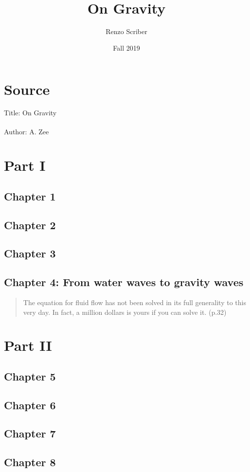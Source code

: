 \documentclass[a4paper]{article}
\title{On Gravity}
\author{Renzo Scriber}
\date{Fall 2019}
\begin{document}
\maketitle

\section*{Source}
Title: On Gravity
\\
\\
Author: A. Zee
\section*{Part I}
    \subsection*{Chapter 1}
    \subsection*{Chapter 2}
    \subsection*{Chapter 3}
    \subsection*{Chapter 4: From water waves to gravity waves}
        \begin{quote}
            The equation for fluid flow has not been solved in its full generality to this very day. In fact, a million dollars is yours if you can solve it. (p.32)
        \end{quote}
\section*{Part II}
    \subsection*{Chapter 5}
    \subsection*{Chapter 6}
    \subsection*{Chapter 7}
    \subsection*{Chapter 8}
\end{document}
